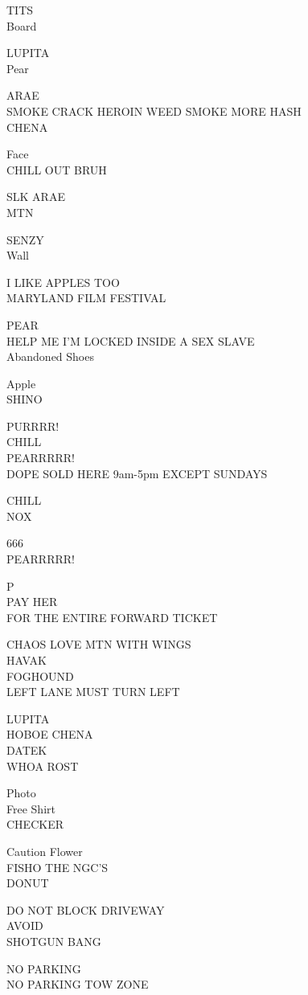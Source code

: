 \documentclass[10pt,letterpaper]{article}
\begin{document}
TITS\\
Board

LUPITA\\
Pear

ARAE\\
SMOKE CRACK HEROIN WEED SMOKE MORE HASH\\
CHENA

Face\\
CHILL OUT BRUH

SLK ARAE\\
MTN

SENZY\\
Wall

I LIKE APPLES TOO\\
MARYLAND FILM FESTIVAL

PEAR\\
HELP ME I'M LOCKED INSIDE A SEX SLAVE\\
Abandoned Shoes

Apple\\
SHINO

PURRRR!\\
CHILL\\
PEARRRRR!\\
DOPE SOLD HERE 9am{-}5pm EXCEPT SUNDAYS

CHILL\\
NOX

666\\
PEARRRRR!

P\\
PAY HER\\
FOR THE ENTIRE FORWARD TICKET

CHAOS LOVE MTN WITH WINGS\\
HAVAK\\
FOGHOUND\\
LEFT LANE MUST TURN LEFT

LUPITA\\
HOBOE CHENA\\
DATEK\\
WHOA ROST

Photo\\
Free Shirt\\
CHECKER

Caution Flower\\
FISHO THE NGC'S\\
DONUT

DO NOT BLOCK DRIVEWAY\\
AVOID\\
SHOTGUN BANG

NO PARKING\\
NO PARKING TOW ZONE
\end{document}
